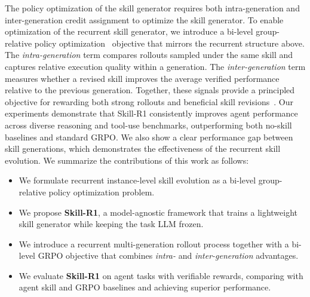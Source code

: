 The policy optimization of the skill generator requires both intra-generation and inter-generation credit assignment to optimize the skill generator.
To enable optimization of the recurrent skill generator, we introduce a bi-level group-relative policy optimization~\citep{zhong2026rc,shao2024deepseekmath,mundada2026wsgrpo} objective that mirrors the recurrent structure above. 
The \emph{intra-generation} term compares rollouts sampled under the same skill and captures relative execution quality within a generation. 
The \emph{inter-generation} term measures whether a revised skill improves the average verified performance relative to the previous generation.
Together, these signals provide a principled objective for rewarding both strong rollouts and beneficial skill revisions~\citep{wu2025incontext, surana2026massdpo, li2025impsamplingdpo, huang2025pluralistic}.
Our experiments demonstrate that Skill-R1 consistently improves agent performance across diverse reasoning and tool-use benchmarks, outperforming both no-skill baselines and standard GRPO. 
We also show a clear performance gap between skill generations, which demonstrates the effectiveness of the recurrent skill evolution.
We summarize the contributions of this work as follows:
\begin{itemize}
    \item We formulate recurrent instance-level skill evolution as a bi-level group-relative policy optimization problem.
    \item We propose \textbf{Skill-R1}, a model-agnostic framework that trains a lightweight skill generator while keeping the task LLM frozen.
    \item We introduce a recurrent multi-generation rollout process together with a bi-level GRPO objective that combines \emph{intra-} and \emph{inter-generation} advantages. 
    \item We evaluate \textbf{Skill-R1} on agent tasks with verifiable rewards, comparing with agent skill and GRPO baselines and achieving superior performance.
\end{itemize}